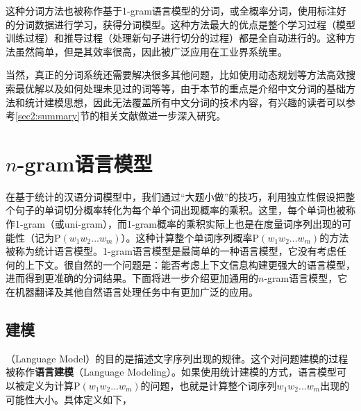\parinterval 这种分词方法也被称作基于1-gram语言模型的分词，或全概率分词，使用标注好的分词数据进行学习，获得分词模型。这种方法最大的优点是整个学习过程（模型训练过程）和推导过程（处理新句子进行切分的过程）都是全自动进行的。这种方法虽然简单，但是其效率很高，因此被广泛应用在工业界系统里。

\parinterval 当然，真正的分词系统还需要解决很多其他问题，比如使用动态规划等方法高效搜索最优解以及如何处理未见过的词等等，由于本节的重点是介绍中文分词的基础方法和统计建模思想，因此无法覆盖所有中文分词的技术内容，有兴趣的读者可以参考\ref{sec2:summary}节的相关文献做进一步深入研究。


\sectionnewpage
\section{$n$-gram语言模型 }

\parinterval 在基于统计的汉语分词模型中，我们通过``大题小做''的技巧，利用独立性假设把整个句子的单词切分概率转化为每个单个词出现概率的乘积。这里，每个单词也被称作1-gram（或uni-gram），而1-gram概率的乘积实际上也是在度量词序列出现的可能性（记为$\textrm{P}(w_1 w_2...w_m)$）。这种计算整个单词序列概率$\textrm{P}(w_1 w_2...w_m)$的方法被称为统计语言模型。1-gram语言模型是最简单的一种语言模型，它没有考虑任何的上下文。很自然的一个问题是：能否考虑上下文信息构建更强大的语言模型，进而得到更准确的分词结果。下面将进一步介绍更加通用的$n$-gram语言模型，它在机器翻译及其他自然语言处理任务中有更加广泛的应用。


\subsection{建模}

（Language Model）的目的是描述文字序列出现的规律。这个对问题建模的过程被称作{\small\sffamily\bfseries{语言建模}}（Language Modeling）。如果使用统计建模的方式，语言模型可以被定义为计算$\textrm{P}(w_1 w_2...w_m)$的问题，也就是计算整个词序列$w_1 w_2...w_m$出现的可能性大小。具体定义如下，

